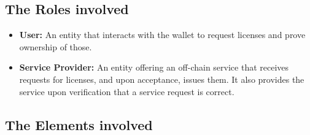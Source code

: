 \subsection{The Roles involved} 

\begin{itemize}
    \item \textbf{User:} An entity that interacts with the wallet to request licenses and prove ownership of those.
    \item \textbf{Service Provider:} An entity offering an off-chain service that receives requests for licenses, and upon acceptance, issues them. It also provides the service upon verification that a service request is correct.
\end{itemize}

\subsection{The Elements involved} 

